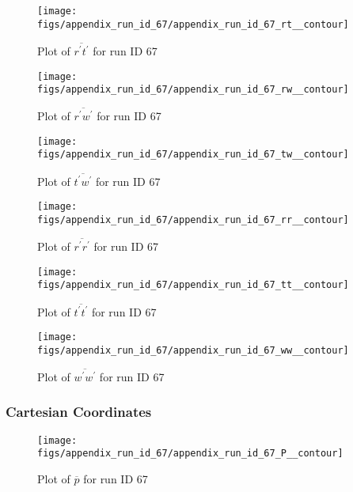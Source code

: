 \begin{figure}[H]
\centering
\texttt{[image: figs/appendix\_run\_id\_67/appendix\_run\_id\_67\_rt\_\_contour]}
\caption{Plot of $\overline{r^\prime t^\prime}$ for run ID 67}
\label{fig:appendix_run_id_67_rt__contour}
\end{figure}


\begin{figure}[H]
\centering
\texttt{[image: figs/appendix\_run\_id\_67/appendix\_run\_id\_67\_rw\_\_contour]}
\caption{Plot of $\overline{r^\prime w^\prime}$ for run ID 67}
\label{fig:appendix_run_id_67_rw__contour}
\end{figure}


\begin{figure}[H]
\centering
\texttt{[image: figs/appendix\_run\_id\_67/appendix\_run\_id\_67\_tw\_\_contour]}
\caption{Plot of $\overline{t^\prime w^\prime}$ for run ID 67}
\label{fig:appendix_run_id_67_tw__contour}
\end{figure}


\begin{figure}[H]
\centering
\texttt{[image: figs/appendix\_run\_id\_67/appendix\_run\_id\_67\_rr\_\_contour]}
\caption{Plot of $\overline{r^\prime r^\prime}$ for run ID 67}
\label{fig:appendix_run_id_67_rr__contour}
\end{figure}


\begin{figure}[H]
\centering
\texttt{[image: figs/appendix\_run\_id\_67/appendix\_run\_id\_67\_tt\_\_contour]}
\caption{Plot of $\overline{t^\prime t^\prime}$ for run ID 67}
\label{fig:appendix_run_id_67_tt__contour}
\end{figure}


\begin{figure}[H]
\centering
\texttt{[image: figs/appendix\_run\_id\_67/appendix\_run\_id\_67\_ww\_\_contour]}
\caption{Plot of $\overline{w^\prime w^\prime}$ for run ID 67}
\label{fig:appendix_run_id_67_ww__contour}
\end{figure}


\subsubsection{Cartesian Coordinates}
\begin{figure}[H]
\centering
\texttt{[image: figs/appendix\_run\_id\_67/appendix\_run\_id\_67\_P\_\_contour]}
\caption{Plot of $\overline{p}$ for run ID 67}
\label{fig:appendix_run_id_67_P__contour}
\end{figure}


